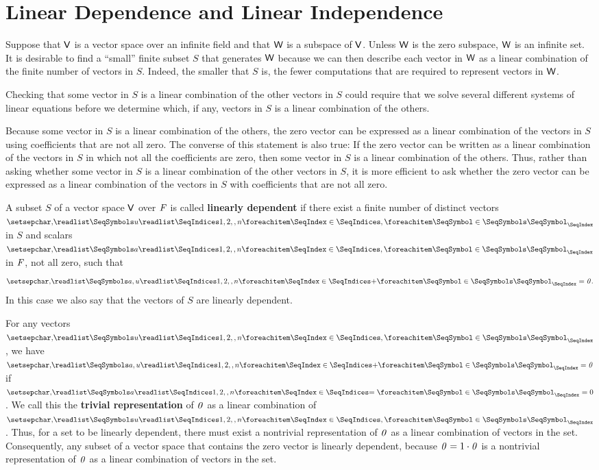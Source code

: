 \section{Linear Dependence and Linear Independence}\label{sec:1.5}

\begin{note}
  Suppose that \(\mathsf{V}\) is a vector space over an infinite field and that \(\mathsf{W}\) is a subspace of \(\mathsf{V}\).
  Unless \(\mathsf{W}\) is the zero subspace, \(\mathsf{W}\) is an infinite set.
  It is desirable to find a ``small'' finite subset \(S\) that generates \(\mathsf{W}\) because we can then describe each vector in \(\mathsf{W}\) as a linear combination of the finite number of vectors in \(S\).
  Indeed, the smaller that \(S\) is, the fewer computations that are required to represent vectors in \(\mathsf{W}\).

  Checking that some vector in \(S\) is a linear combination of the other vectors in \(S\) could require that we solve several different systems of linear equations before we determine which, if any, vectors in \(S\) is a linear combination of the others.

  Because some vector in \(S\) is a linear combination of the others, the zero vector can be expressed as a linear combination of the vectors in \(S\) using coefficients that are not all zero.
  The converse of this statement is also true:
  If the zero vector can be written as a linear combination of the vectors in \(S\) in which not all the coefficients are zero, then some vector in \(S\) is a linear combination of the others.
  Thus, rather than asking whether some vector in \(S\) is a linear combination of the other vectors in \(S\), it is more efficient to ask whether the zero vector can be expressed as a linear combination of the vectors in \(S\) with coefficients that are not all zero.
\end{note}

\begin{defn}\label{1.5.1}
  A subset \(S\) of a vector space \(\mathsf{V}\) over \(\mathit{F}\) is called \textbf{linearly dependent} if there exist a finite number of distinct vectors \(\seq{u}{1,2,,n}\) in \(S\) and scalars \(\seq{a}{1,2,,n}\) in \(\mathit{F}\), not all zero, such that
  \[
    \seq[+]{a,u}{1,2,,n} = \zv.
  \]
  In this case we also say that the vectors of \(S\) are linearly dependent.
\end{defn}

\begin{defn}\label{1.5.2}
  For any vectors \(\seq{u}{1,2,,n}\), we have \(\seq[+]{a,u}{1,2,,n} = \zv\) if \(\seq[=]{a}{1,2,,n} = 0\).
  We call this the \textbf{trivial representation} of \(\mathit{0}\) as a linear combination of \(\seq{u}{1,2,,n}\).
  Thus, for a set to be linearly dependent, there must exist a nontrivial representation of \(\mathit{0}\) as a linear combination of vectors in the set.
  Consequently, any subset of a vector space that contains the zero vector is linearly dependent, because \(\mathit{0} = 1 \cdot \mathit{0}\) is a nontrivial representation of \(\mathit{0}\) as a linear combination of vectors in the set.
\end{defn}

